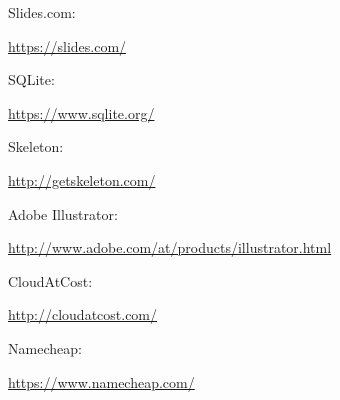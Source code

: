 \documentclass[12pt,a4paper,naustrian,english,oneside,openright,DIV=12,BCOR=1cm]{scrbook}
\begin{document}
\begin{thebibliography}{999}
	 Slides.com:
	
	\url{https://slides.com/}
	
	 SQLite:
	
	\url{https://www.sqlite.org/}
	
	 Skeleton:
  
 	\url{http://getskeleton.com/}	
 	
 	 Adobe Illustrator:
  
 	\url{http://www.adobe.com/at/products/illustrator.html}
 	
 	 CloudAtCost:
  
 	\url{http://cloudatcost.com/}
 	
 	 Namecheap:
  
 	\url{https://www.namecheap.com/}
	
\end{thebibliography}
\end{document}

